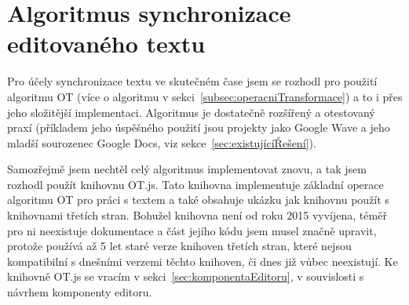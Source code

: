 
\section{Algoritmus synchronizace editovaného textu}\label{sec:synchronizaceEditovanéhoTextu}

Pro účely synchronizace textu ve skutečném čase jsem se rozhodl pro použití algoritmu \gls{OT} (více o algoritmu v sekci~\ref{subsec:operacniTransformace}) a to i přes jeho složitější implementaci.
Algoritmus je dostatečně rozšířený a otestovaný praxí (příkladem jeho úspěšného použití jsou projekty jako Google Wave a jeho mladší sourozenec Google Docs, viz sekce~\ref{sec:existujícíŘešení}).

Samozřejmě jsem nechtěl celý algoritmus implementovat znovu, a tak jsem rozhodl použít knihovnu OT.js.
Tato knihovna implementuje základní operace algoritmu \gls{OT} pro práci s textem a také obsahuje ukázku jak knihovnu použít s knihovnami třetích stran.
Bohužel knihovna není od roku 2015 vyvíjena, téměř pro ni neexistuje dokumentace a část jejího kódu jsem musel značně upravit, protože používá až 5 let staré verze knihoven třetích stran, které nejsou kompatibilní s dnešními verzemi těchto knihoven, či dnes již vůbec neexistují.
Ke knihovně OT.js se vracím v sekci~\ref{sec:komponentaEditoru}, v souvislosti s návrhem komponenty editoru.
